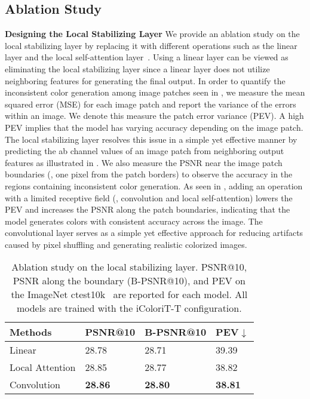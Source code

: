 \documentclass[10pt,twocolumn,letterpaper]{article}
\begin{document}
\subsection{Ablation Study}
\vspace{-0.1cm}
\noindent \textbf{Designing the Local Stabilizing Layer}
\label{sec:quali-ablation}
We provide an ablation study on the local stabilizing layer by replacing it with different operations such as the linear layer and the local self-attention layer~\cite{localattn}. 
Using a linear layer can be viewed as eliminating the local stabilizing layer since a linear layer does not utilize neighboring features for generating the final output. 
In order to quantify the inconsistent color generation among image patches seen in , we measure the mean squared error (MSE) for each image patch and report the variance of the errors within an image. 
We denote this measure the patch error variance (PEV). 
A high PEV implies that the model has varying accuracy depending on the image patch. 
The local stabilizing layer resolves this issue in a simple yet effective manner by predicting the ab channel values of an image patch from neighboring output features as illustrated in . 
We also measure the PSNR near the image patch boundaries (\ie, one pixel from the patch borders) to observe the accuracy in the regions containing inconsistent color generation. 
As seen in , adding an operation with a limited receptive field (\ie, convolution and local self-attention) lowers the PEV and increases the PSNR along the patch boundaries, indicating that the model generates colors with consistent accuracy across the image.
The convolutional layer serves as a simple yet effective approach for reducing artifacts caused by pixel shuffling and generating realistic colorized images. 

\begin{table}[t]
\centering
\begin{tabular}{@{}x{2.4cm}x{1.6cm}x{1.95cm}x{1.0cm}@{}}
\toprule
Methods               & PSNR@10        & B-PSNR@10            & PEV$\downarrow$ \\ \midrule
Linear                & 28.78          & 28.71                & 39.39            \\
Local Attention       & 28.85          & 28.77                & 38.82            \\ \midrule
Convolution           & \textbf{28.86} & \textbf{28.80}       & \textbf{38.81}   \\ \bottomrule
\end{tabular}
\vspace{0.1cm}
\caption{Ablation study on the local stabilizing layer. PSNR@10, PSNR along the boundary (B-PSNR@10), and PEV on the ImageNet ctest10k~\cite{ctest} are reported for each model. All models are trained with the iColoriT-T configuration.}
\label{tab:exp_ablation_conv}
\vspace{-0.3cm}
\end{table}
\end{document}
